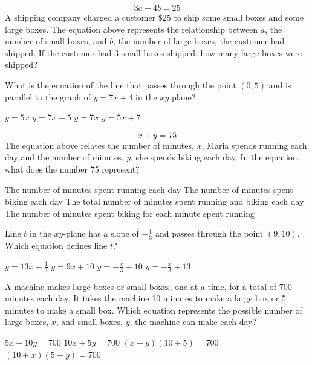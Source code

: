 \question[1]
\[3a+4b=25\]
A shipping company charged a customer \$25 to ship some small boxes and some large boxes. The equation above represents the relationship between $a$, the number of small boxes, and $b$, the number of large boxes, the customer had shipped. If the customer had 3 small boxes shipped, how many large boxes were shipped?
\begin{choices}
\end{choices}

\question[1]
What is the equation of the line that passes through the point $(0,5)$ and is parallel to the graph of $y=7x+4$ in the $xy$ plane?
\begin{choices}
  \choice $y=5x$
  \CorrectChoice $y=7x+5$
  \choice $y=7x$
  \choice $y=5x+7$
\end{choices}




\newpage



\question[1]
\[x+y=75\]
The equation above relates the number of minutes, $x$, Maria spends running each day and the number of minutes, $y$, she spends biking each day. In the equation, what does the number 75 represent?
\begin{choices}
  \choice The number of minutes spent running each day
  \choice The number of minutes spent biking each day
  \CorrectChoice The total number of minutes spent running and biking each day
  \choice The number of minutes spent biking for each minute spent running
\end{choices}


\question[1]
Line $t$ in the $xy$-plane has a slope of $-\frac{1}{3}$ and passes through the point $(9,10)$. Which equation defines line $t$?
\begin{choices}
  \choice $y=13x-\frac{1}{3}$
  \choice $y=9x+10$
  \choice $y=-\frac{x}{3}+10$
  \CorrectChoice $y=-\frac{x}{3}+13$
\end{choices}

\question[1]
A machine makes large boxes or small boxes, one at a time, for a total of 700 minutes each day. It takes the machine 10 minutes to make a large box or 5 minutes to make a small box. Which equation represents the possible number of large boxes, $x$, and small boxes, $y$, the machine can make each day?
\begin{choices}
  \choice $5x+10y=700$
  \CorrectChoice $10x+5y=700$
  \choice $(x+y)(10+5)=700$
  \choice $(10+x)(5+y)=700$
\end{choices}




